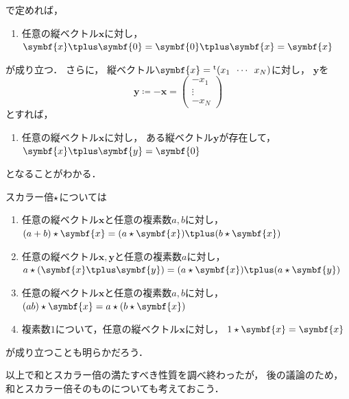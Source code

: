 \documentclass[
]{sotsu}
\newcommand{\fire}[1]{\textcolor{fire}{#1}}
\newcommand{\water}[1]{\textcolor{water}{#1}}
\begin{document}
で定めれば，
\begin{enumerate}
    \item[\labelcref*{vector:sum-zero}] 
        \fire{任意の縦ベクトル$\symbf{x}$}に対し，
        $\symbf{x} \vecplus \symbf{0} = \symbf{0} \vecplus \symbf{x} = \symbf{x}$
\end{enumerate}
が成り立つ．
さらに，
縦ベクトル$\symbf{x} = \cvector{x_1 ; \cdots ; x_N}$に対し，
$\symbf{y}$を
\begin{equation*}
    \symbf{y} \coloneq 
    -\symbf{x} =
    \begin{pmatrix}
        -x_1  \\  \vdots  \\  -x_N
    \end{pmatrix}
\end{equation*}
とすれば，
\begin{enumerate}
    \item[\labelcref*{vector:sum-opposite}] 
        \fire{任意の縦ベクトル$\symbf{x}$}に対し，
        \water{ある縦ベクトル$\symbf{y}$}が存在して，
        $\symbf{x} \vecplus \symbf{y} = \symbf{0}$
\end{enumerate}
となることがわかる．

スカラー倍$\mathbin{\star}$については
\begin{enumerate}
    \item[\labelcref*{vector:scalar-sum}]
        \fire{任意の縦ベクトル$\symbf{x}$}と\fire{任意の複素数$a, b$}に対し，
        $(a + b) \scaprod \symbf{x} = (a \scaprod \symbf{x}) \vecplus (b \scaprod \symbf{x})$
    \item[\labelcref*{vector:scalar-distributive}]
        \fire{任意の縦ベクトル$\symbf{x}, \symbf{y}$}と\fire{任意の複素数$a$}に対し，
        $a \scaprod (\symbf{x} \vecplus \symbf{y}) = (a \scaprod \symbf{x}) \vecplus (a \scaprod \symbf{y})$
    \item[\labelcref*{vector:scalar-prod}]
        \fire{任意の縦ベクトル$\symbf{x}$}と\fire{任意の複素数$a, b$}に対し，
        $(ab) \scaprod \symbf{x} = a \scaprod (b \scaprod \symbf{x})$
    \item[\labelcref*{vector:scalar-identity}]
        複素数$1$について，\fire{任意の縦ベクトル$\symbf{x}$}に対し，
        $1 \scaprod \symbf{x} = \symbf{x}$
\end{enumerate}
が成り立つことも明らかだろう．

以上で和とスカラー倍の満たすべき性質を調べ終わったが，
後の議論のため，
和とスカラー倍そのものについても考えておこう．
\end{document}
